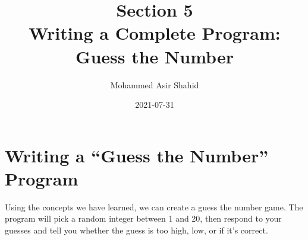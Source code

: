 \documentclass[11pt]{article}
\author{Mohammed Asir Shahid}
\date{2021-07-31}
\title{Section 5\\\medskip
\large Writing a Complete Program: Guess the Number}
\begin{document}
\maketitle
\tableofcontents


\section{Writing a ``Guess the Number'' Program}
\label{sec:orge18032c}

Using the concepts we have learned, we can create a guess the number game. The program will pick a random integer between 1 and 20, then respond to your guesses and tell you whether the guess is too high, low, or if it's correct.
\end{document}
